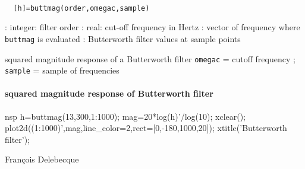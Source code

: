 
\begin{mandesc}
   \\ %
\end{mandesc}
\begin{calling_sequence}
\begin{verbatim}
  [h]=buttmag(order,omegac,sample)  
\end{verbatim}
\end{calling_sequence}
\begin{parameters}
  \begin{varlist}
    : integer: filter order
    : real: cut-off frequency in Hertz
    : vector of frequency where \verb!buttmag! is evaluated
    : Butterworth filter values at sample points
  \end{varlist}
\end{parameters}
\begin{mandescription}
  squared magnitude response of a Butterworth filter
  \verb!omegac! = cutoff frequency ; \verb!sample! = sample of frequencies
\end{mandescription}
\begin{examples}
  \paragraph{squared magnitude response of Butterworth filter}
  \begin{mintednsp}{nsp}
    h=buttmag(13,300,1:1000);
    mag=20*log(h)'/log(10);
    xclear();
    plot2d((1:1000)',mag,line_color=2,rect=[0,-180,1000,20]);
    xtitle('Butterworth filter');
  \end{mintednsp}
\end{examples}
\begin{authors}
  Fran\c{c}ois  Delebecque  
\end{authors}
